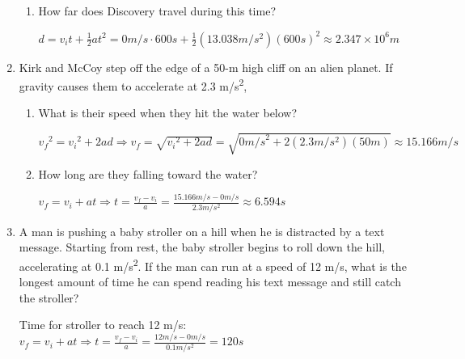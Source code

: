 \documentclass[letterpaper, 12pt]{article}
\begin{document}
\begin{enumerate}
\begin{enumerate}
		\item How far does Discovery travel during this time? 
		\color{red}
				\vspace{0.2in}
			\begin{center}
				$ d = v_i t + \frac{1}{2}at^2 = 0m/s \cdot 600s + \frac{1}{2}(13.038m/s^2)(600s)^2 \approx 2.347 \times 10^6 m   $
				\vspace{0.2in}
			\end{center}
		\color{black}	
		
		
		
		
	\end{enumerate}
	\item Kirk and McCoy step off the edge of a 50-m high cliff on an alien planet.  If gravity causes them to accelerate at 2.3 m/s\textsuperscript{2},
	\begin{enumerate}
		\item What is their speed when they hit the water below?
	
		\color{red}
		\vspace{0.15in}
		\begin{center}
			$ {v_f}^2 = {v_i}^2 + 2 a d \Longrightarrow {v_f} = \sqrt{{v_i}^2 + 2 a d } = \sqrt{{0m/s}^2 + 2 (2.3 m/s^2) (50m) } \approx 15.166 m/s  $
			\vspace{0.15in}
		\end{center}
		\color{black}	
		
		\item How long are they falling toward the water?
		\vspace{0.15in}
		\color{red}
		\begin{center}
			$ v_f = v_i + a t \Longrightarrow t = \frac{v_f - v_i}{a} = \frac{15.166 m/s - 0 m/s} {2.3 m/s^2} \approx 6.594 s   $
			\vspace{0.15in}
		\end{center}
		\color{black}		
		
		
	\end{enumerate}

	\item A man is pushing a baby stroller on a hill when he is distracted by a text message.  Starting from rest, the baby stroller begins to roll down the hill, accelerating at 0.1 m/s\textsuperscript{2}.  If the man can run at a speed of 12 m/s, what is the longest amount of time he can spend reading his text message and still catch the stroller?
	
	\color{red}
	Time for stroller to reach 12 m/s: $ v_f = v_i + a t \Longrightarrow t = \frac{v_f - v_i}{a} = \frac{12 m/s - 0 m/s} {0.1 m/s^2} =120 s   $
	\vspace{0.1in}
	

\end{enumerate}
\end{document}
